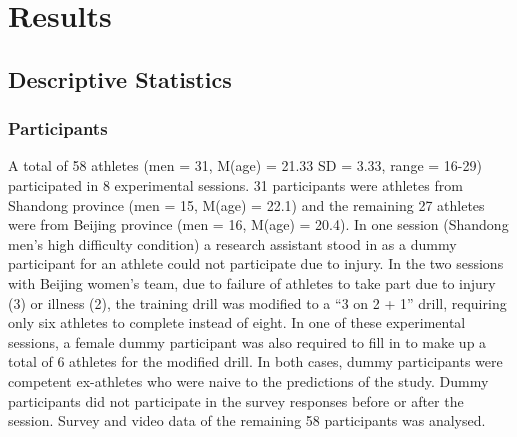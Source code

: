 

\section{Results}




\subsection{Descriptive Statistics \label{sec:descriptives}}

\subsubsection{Participants}

A total of 58 athletes (men = 31, M(age) = 21.33 SD = 3.33, range = 16-29) participated in 8 experimental sessions. 31 participants were athletes from Shandong province (men = 15, M(age) = 22.1) and the remaining 27 athletes were from Beijing province (men = 16, M(age) = 20.4).  In one session (Shandong men's high difficulty condition) a research assistant stood in as a dummy participant for an athlete could not participate due to injury.  In the two sessions with Beijing women's team, due to failure of athletes to take part due to injury (3) or illness (2), the training drill was modified to a ``3 on 2 + 1'' drill, requiring only six athletes to complete instead of eight. In one of these experimental sessions, a female dummy participant was also required to fill in to make up a total of 6 athletes for the modified drill.  In both cases, dummy participants were competent ex-athletes who were naive to the predictions of the study.  Dummy participants did not participate in the survey responses before or after the session. Survey and video data of the remaining 58 participants was analysed.



